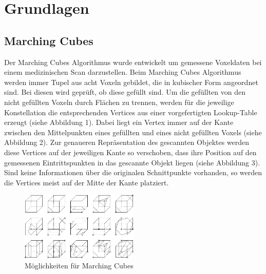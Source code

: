 
\section{Grundlagen}
\label{sec:grundlagen}

\subsection{Marching Cubes}
\label{subsec:marchingCubes}
Der Marching Cubes Algorithmus wurde entwickelt um gemessene Voxeldaten bei einem medizinischen Scan darzustellen. Beim Marching Cubes Algorithmus werden immer Tupel aus acht Voxeln gebildet, die in kubischer Form angeordnet sind. Bei diesen wird geprüft, ob diese gefüllt sind. Um die gefüllten von den nicht gefüllten Voxeln durch Flächen zu trennen, werden für die jeweilige Konstellation die entsprechenden Vertices aus einer vorgefertigten Lookup-Table erzeugt (siehe Abbildung 1). Dabei liegt ein Vertex immer auf der Kante zwischen den Mittelpunkten eines gefüllten und eines nicht gefüllten Voxels (siehe Abbildung 2). Zur genaueren Repräsentation des gescannten Objektes werden diese Vertices auf der jeweiligen Kante so verschoben, dass ihre Position auf den gemessenen Eintrittspunkten in das gescannte Objekt liegen (siehe Abbildung 3). Sind keine Informationen über die originalen Schnittpunkte vorhanden, so werden die Vertices meist auf der Mitte der Kante platziert. \cite{lorensen1987marching} \cite{iomc} \cite{mc02}

\begin{figure}[H]
			\centering
			\includegraphics[width=0.5\textwidth]{figures/MarchingCubesPossibilities}
			\caption[Möglichkeiten für MarchingCubes\cite{mc02}]{Möglichkeiten für Marching Cubes \label{MarchingCubesPossibilities}}
		\end{figure}
		
